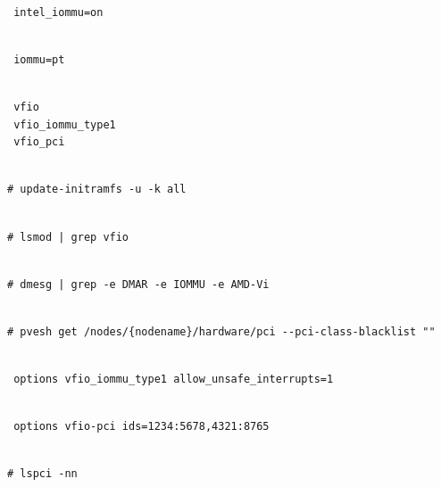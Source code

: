 \begin{lstlisting}

 intel_iommu=on

\end{lstlisting}

\begin{lstlisting}

 iommu=pt

\end{lstlisting}

\begin{lstlisting}

 vfio
 vfio_iommu_type1
 vfio_pci

\end{lstlisting}

\begin{lstlisting}

# update-initramfs -u -k all

\end{lstlisting}

\begin{lstlisting}

# lsmod | grep vfio

\end{lstlisting}

\begin{lstlisting}

# dmesg | grep -e DMAR -e IOMMU -e AMD-Vi

\end{lstlisting}

\begin{lstlisting}

# pvesh get /nodes/{nodename}/hardware/pci --pci-class-blacklist ""

\end{lstlisting}

\begin{lstlisting}

 options vfio_iommu_type1 allow_unsafe_interrupts=1

\end{lstlisting}

\begin{lstlisting}

 options vfio-pci ids=1234:5678,4321:8765

\end{lstlisting}

\begin{lstlisting}

# lspci -nn

\end{lstlisting}

